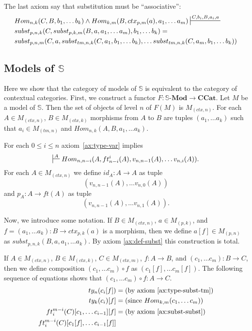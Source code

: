 \documentclass[reqno]{amsart}
\theoremstyle{definition}
\theoremstyle{remark}
\newcommand{\cat}[1]{\mathbf{#1}}
\newcommand{\ccat}{\cat{CCat}}
\newcommand{\substTh}{\mathbb{S}}
\newcommand{\Mod}[1]{#1\text{-}\cat{Mod}}
\numberwithin{figure}{section}
\begin{document}
The last axiom say that substitution must be ``associative'':
\begin{align}
\label{ax:subst-subst}
& Hom_{n,k}(C, B, b_1, \ldots b_k) \land Hom_{k,m}(B, ctx_{p,m}(a), a_1, \ldots a_m) \sststile{}{C, b_i, B, a_i, a} \\ \notag
& subst_{p,n,k}(C, subst_{p,k,m}(B, a, a_1, \ldots a_m), b_1, \ldots b_k) = \\ \notag
& subst_{p,n,m}(C, a, subst_{tm,n,k}(C, a_1, b_1, \ldots b_k), \ldots subst_{tm,n,k}(C, a_m, b_1, \ldots b_k))
\end{align}

\subsection{Models of $\substTh$}

Here we show that the category of models of $\substTh$ is equivalent to the category of contextual categories.
First, we construct a functor $F : \Mod{\substTh} \to \ccat$.
Let $M$ be a model of $\substTh$.
Then the set of objects of level $n$ of $F(M)$ is $M_{(ctx,n)}$.
For each $A \in M_{(ctx,n)}$, $B \in M_{(ctx,k)}$ morphisms from $A$ to $B$ are tuples $(a_1, \ldots a_k)$ such that $a_i \in M_{(tm,n)}$ and $Hom_{n,k}(A, B, a_1, \ldots a_k)$.

For each $0 \leq i \leq n$ axiom~\eqref{ax:type-var} implies
\[ \sststile{}{A} Hom_{n,n-i}(A, ft^i_{n-i}(A), v_{n,n-1}(A), \ldots v_{n,i}(A)). \]
For each $A \in M_{(ctx,n)}$ we define $id_A : A \to A$ as tuple
\[ (v_{n,n-1}(A), \ldots v_{n,0}(A)) \]
and $p_A : A \to ft(A)$ as tuple
\[ (v_{n,n-1}(A), \ldots v_{n,1}(A)). \]

Now, we introduce some notation.
If $B \in M_{(ctx,n)}$, $a \in M_{(p,k)}$, and $f = (a_1, \ldots a_k) : B \to ctx_{p,k}(a)$ is a morphism, then we define $a[f] \in M_{(p,n)}$ as $subst_{p,n,k}(B, a, a_1, \ldots a_k)$.
By axiom \eqref{ax:def-subst} this construction is total.

If $A \in M_{(ctx,n)}$, $B \in M_{(ctx,k)}$, $C \in M_{(ctx,m)}$, $f : A \to B$, and $(c_1, \ldots c_m) : B \to C$,
    then we define composition $(c_1, \ldots c_m) \circ f$ as $(c_1[f], \ldots c_m[f])$.
The following sequence of equations shows that $(c_1, \ldots c_m) \circ f : A \to C$.
\begin{align*}
ty_n(c_i[f]) & = \text{(by axiom~\eqref{ax:type-subst-tm})} \\
ty_k(c_i)[f] & = \text{(since $Hom_{k,m}(c_1, \ldots c_m)$)} \\
ft^{m-i}_i(C)[c_1, \ldots c_{i-1}][f] & = \text{(by axiom~\eqref{ax:subst-subst})} \\
ft^{m-i}_i(C)[c_1[f], \ldots c_{i-1}[f]] &
\end{align*}
\end{document}
